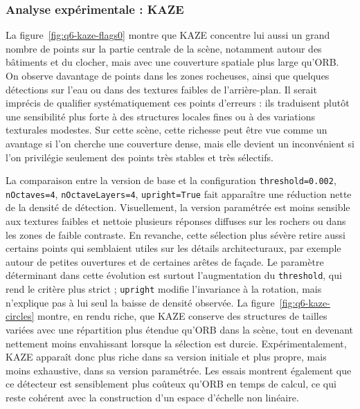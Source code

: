 \documentclass[11pt,a4paper]{article}
\begin{document}
\subsubsection{Analyse expérimentale : KAZE}
La figure~\ref{fig:q6-kaze-flags0} montre que KAZE concentre lui aussi un grand nombre de points sur la partie centrale de la scène, notamment autour des bâtiments et du clocher, mais avec une couverture spatiale plus large qu'ORB. On observe davantage de points dans les zones rocheuses, ainsi que quelques détections sur l'eau ou dans des textures faibles de l'arrière-plan. Il serait imprécis de qualifier systématiquement ces points d'erreurs : ils traduisent plutôt une sensibilité plus forte à des structures locales fines ou à des variations texturales modestes. Sur cette scène, cette richesse peut être vue comme un avantage si l'on cherche une couverture dense, mais elle devient un inconvénient si l'on privilégie seulement des points très stables et très sélectifs.

La comparaison entre la version de base et la configuration \texttt{threshold=0.002}, \texttt{nOctaves=4}, \texttt{nOctaveLayers=4}, \texttt{upright=True} fait apparaître une réduction nette de la densité de détection. Visuellement, la version paramétrée est moins sensible aux textures faibles et nettoie plusieurs réponses diffuses sur les rochers ou dans les zones de faible contraste. En revanche, cette sélection plus sévère retire aussi certains points qui semblaient utiles sur les détails architecturaux, par exemple autour de petites ouvertures et de certaines arêtes de façade. Le paramètre déterminant dans cette évolution est surtout l'augmentation du \texttt{threshold}, qui rend le critère plus strict ; \texttt{upright} modifie l'invariance à la rotation, mais n'explique pas à lui seul la baisse de densité observée. La figure~\ref{fig:q6-kaze-circles} montre, en rendu riche, que KAZE conserve des structures de tailles variées avec une répartition plus étendue qu'ORB dans la scène, tout en devenant nettement moins envahissant lorsque la sélection est durcie. Expérimentalement, KAZE apparaît donc plus riche dans sa version initiale et plus propre, mais moins exhaustive, dans sa version paramétrée. Les essais montrent également que ce détecteur est sensiblement plus coûteux qu'ORB en temps de calcul, ce qui reste cohérent avec la construction d'un espace d'échelle non linéaire.
\end{document}
